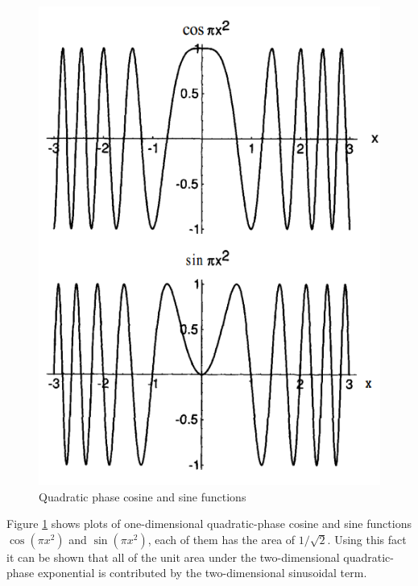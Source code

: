 \documentclass[../main.tex]{subfiles}
\begin{document}
	\begin{figure}[h!]
	  \centering
	  \includegraphics[scale=0.5]{../graphics/Wave_optics7.png}
	  \caption{Quadratic phase cosine and sine functions}
	  \label{fig:Quadratic}
	\end{figure}

	Figure \ref{fig:Quadratic} shows plots of one-dimensional quadratic-phase cosine and sine functions $\cos(\pi x^2)$ and $\sin(\pi x^2)$, each of them has the area of $1/\sqrt{2}$. Using this fact it can be shown that all of the unit area under the two-dimensional quadratic-phase exponential is contributed by the two-dimensional sinusoidal term.
\end{document}
